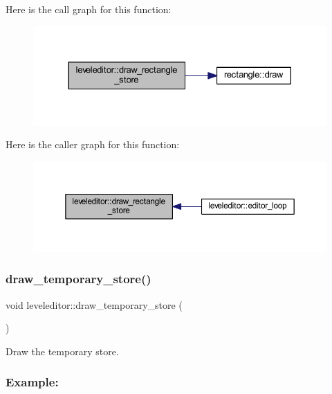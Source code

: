 Here is the call graph for this function\+:
\nopagebreak
\begin{figure}[H]
\begin{center}
\leavevmode
\includegraphics[width=330pt]{classleveleditor_ae819c7275982ef9e2891017985560c6d_cgraph}
\end{center}
\end{figure}
Here is the caller graph for this function\+:
\nopagebreak
\begin{figure}[H]
\begin{center}
\leavevmode
\includegraphics[width=350pt]{classleveleditor_ae819c7275982ef9e2891017985560c6d_icgraph}
\end{center}
\end{figure}
\mbox{\label{classleveleditor_a3478cade84f5ff58c06df2c173c9127d}} 
\subsubsection{\texorpdfstring{draw\+\_\+temporary\+\_\+store()}{draw\_temporary\_store()}}
{\footnotesize\ttfamily void leveleditor\+::draw\+\_\+temporary\+\_\+store (\begin{DoxyParamCaption}{ }\end{DoxyParamCaption})}



Draw the temporary store. 

\subsubsection*{Example\+: }

